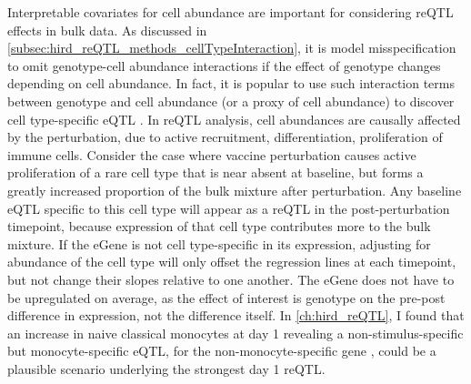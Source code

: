 Interpretable covariates for cell abundance are important for considering \gls{reQTL} effects in bulk data.
As discussed in \cref{subsec:hird_reQTL_methods_cellTypeInteraction}, 
it is model misspecification to omit genotype-cell abundance interactions if the effect of genotype changes depending on cell abundance.
In fact, it is popular to use such interaction terms between genotype and cell abundance (or a proxy of cell abundance) 
to discover cell type-specific \gls{eQTL} \autocite{westra2015CellSpecificEQTL,kim-hellmuth2020CellTypeSpecific}.
In \gls{reQTL} analysis, cell abundances are causally affected by the perturbation, due to active recruitment, differentiation, proliferation of immune cells.
Consider the case where vaccine perturbation causes active proliferation of a rare cell type that is near absent at baseline, 
but forms a greatly increased proportion of the bulk mixture after perturbation.
Any baseline \gls{eQTL} specific to this cell type will appear as a \gls{reQTL} in the post-perturbation timepoint, 
because expression of that cell type contributes more to the bulk mixture.
If the eGene is not cell type-specific in its expression, 
adjusting for abundance of the cell type will only offset the regression lines at each timepoint, but not change their slopes relative to one another.
The eGene does not have to be upregulated on average, 
as the effect of interest is genotype on the pre-post difference in expression, not the difference itself.
In \cref{ch:hird_reQTL}, I found that an increase in naive classical monocytes at day 1 revealing a
non-stimulus-specific but monocyte-specific \gls{eQTL},
for the non-monocyte-specific gene ,
could be a plausible scenario underlying the strongest day 1 \gls{reQTL}.

